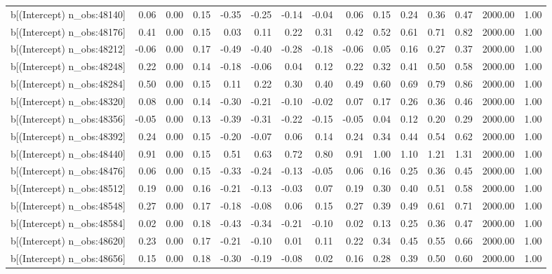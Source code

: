 \begin{table}[ht]
\begin{tabular}{rrrrrrrrrrrrrrr}
  b[(Intercept) n\_obs:48140] & 0.06 & 0.00 & 0.15 & -0.35 & -0.25 & -0.14 & -0.04 & 0.06 & 0.15 & 0.24 & 0.36 & 0.47 & 2000.00 & 1.00 \\ 
  b[(Intercept) n\_obs:48176] & 0.41 & 0.00 & 0.15 & 0.03 & 0.11 & 0.22 & 0.31 & 0.42 & 0.52 & 0.61 & 0.71 & 0.82 & 2000.00 & 1.00 \\ 
  b[(Intercept) n\_obs:48212] & -0.06 & 0.00 & 0.17 & -0.49 & -0.40 & -0.28 & -0.18 & -0.06 & 0.05 & 0.16 & 0.27 & 0.37 & 2000.00 & 1.00 \\ 
  b[(Intercept) n\_obs:48248] & 0.22 & 0.00 & 0.14 & -0.18 & -0.06 & 0.04 & 0.12 & 0.22 & 0.32 & 0.41 & 0.50 & 0.58 & 2000.00 & 1.00 \\ 
  b[(Intercept) n\_obs:48284] & 0.50 & 0.00 & 0.15 & 0.11 & 0.22 & 0.30 & 0.40 & 0.49 & 0.60 & 0.69 & 0.79 & 0.86 & 2000.00 & 1.00 \\ 
  b[(Intercept) n\_obs:48320] & 0.08 & 0.00 & 0.14 & -0.30 & -0.21 & -0.10 & -0.02 & 0.07 & 0.17 & 0.26 & 0.36 & 0.46 & 2000.00 & 1.00 \\ 
  b[(Intercept) n\_obs:48356] & -0.05 & 0.00 & 0.13 & -0.39 & -0.31 & -0.22 & -0.15 & -0.05 & 0.04 & 0.12 & 0.20 & 0.29 & 2000.00 & 1.00 \\ 
  b[(Intercept) n\_obs:48392] & 0.24 & 0.00 & 0.15 & -0.20 & -0.07 & 0.06 & 0.14 & 0.24 & 0.34 & 0.44 & 0.54 & 0.62 & 2000.00 & 1.00 \\ 
  b[(Intercept) n\_obs:48440] & 0.91 & 0.00 & 0.15 & 0.51 & 0.63 & 0.72 & 0.80 & 0.91 & 1.00 & 1.10 & 1.21 & 1.31 & 2000.00 & 1.00 \\ 
  b[(Intercept) n\_obs:48476] & 0.06 & 0.00 & 0.15 & -0.33 & -0.24 & -0.13 & -0.05 & 0.06 & 0.16 & 0.25 & 0.36 & 0.45 & 2000.00 & 1.00 \\ 
  b[(Intercept) n\_obs:48512] & 0.19 & 0.00 & 0.16 & -0.21 & -0.13 & -0.03 & 0.07 & 0.19 & 0.30 & 0.40 & 0.51 & 0.58 & 2000.00 & 1.00 \\ 
  b[(Intercept) n\_obs:48548] & 0.27 & 0.00 & 0.17 & -0.18 & -0.08 & 0.06 & 0.15 & 0.27 & 0.39 & 0.49 & 0.61 & 0.71 & 2000.00 & 1.00 \\ 
  b[(Intercept) n\_obs:48584] & 0.02 & 0.00 & 0.18 & -0.43 & -0.34 & -0.21 & -0.10 & 0.02 & 0.13 & 0.25 & 0.36 & 0.47 & 2000.00 & 1.00 \\ 
  b[(Intercept) n\_obs:48620] & 0.23 & 0.00 & 0.17 & -0.21 & -0.10 & 0.01 & 0.11 & 0.22 & 0.34 & 0.45 & 0.55 & 0.66 & 2000.00 & 1.00 \\ 
  b[(Intercept) n\_obs:48656] & 0.15 & 0.00 & 0.18 & -0.30 & -0.19 & -0.08 & 0.02 & 0.16 & 0.28 & 0.39 & 0.50 & 0.60 & 2000.00 & 1.00 \\ 

\end{tabular}
\end{table}

